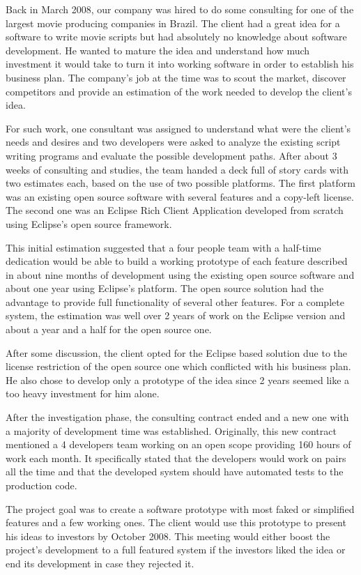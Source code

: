 \documentclass[lnbip]{svmultln}
\begin{document}
Back in March 2008, our company was hired to do some consulting for
one of the largest movie producing companies in Brazil. The client had
a great idea for a software to write movie scripts but had absolutely
no knowledge about software development.  He wanted to mature the idea
and understand how much investment it would take to turn it into
working software in order to establish his business plan. The
company's job at the time was to scout the market, discover
competitors and provide an estimation of the work needed to develop
the client's idea.

For such work, one consultant was assigned to understand what were the
client's needs and desires and two developers were asked to analyze
the existing script writing programs and evaluate the possible
development paths. After about 3 weeks of consulting and studies, the
team handed a deck full of story cards with two estimates each, based
on the use of two possible platforms. The first platform was an
existing open source software with several features and a copy-left
license. The second one was an Eclipse Rich Client Application
developed from scratch using Eclipse's open source framework.

This initial estimation suggested that a four people team with a
half-time dedication would be able to build a working prototype of
each feature described in about nine months of development using the
existing open source software and about one year using Eclipse's
platform. The open source solution had the advantage to provide full
functionality of several other features. For a complete system, the
estimation was well over 2 years of work on the Eclipse version and
about a year and a half for the open source one.

After some discussion, the client opted for the Eclipse based solution
due to the license restriction of the open source one which conflicted
with his business plan. He also chose to develop only a prototype of
the idea since 2 years seemed like a too heavy investment for him
alone.

After the investigation phase, the consulting contract ended and a new
one with a majority of development time was established. Originally,
this new contract mentioned a 4 developers team working on an open
scope providing 160 hours of work each month. It specifically stated
that the developers would work on pairs all the time and that the
developed system should have automated tests to the production code.

The project goal was to create a software prototype with most faked or
simplified features and a few working ones. The client would use this
prototype to present his ideas to investors by October 2008. This
meeting would either boost the project's development to a full
featured system if the investors liked the idea or end its development
in case they rejected it.
\end{document}
